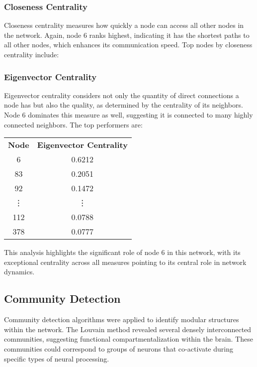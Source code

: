 \documentclass[
	report, %
	11pt, %
]{CSUniSchoolLabReport}
\begin{document}


\subsubsection{Closeness Centrality}

Closeness centrality measures how quickly a node can access all other nodes in the network. Again, node 6 ranks highest, indicating it has the shortest paths to all other nodes, which enhances its communication speed. Top nodes by closeness centrality include:


\subsubsection{Eigenvector Centrality}

Eigenvector centrality considers not only the quantity of direct connections a node has but also the quality, as determined by the centrality of its neighbors. Node 6 dominates this measure as well, suggesting it is connected to many highly connected neighbors. The top performers are:

\begin{tabular}{c c}
\textbf{Node} & \textbf{Eigenvector Centrality} \\
6 & 0.6212 \\
83 & 0.2051 \\
92 & 0.1472 \\
\vdots & \vdots \\
112 & 0.0788 \\
378 & 0.0777 \\
\end{tabular}

This analysis highlights the significant role of node 6 in this network, with its exceptional centrality across all measures pointing to its central role in network dynamics.



\subsection{Community Detection}

Community detection algorithms were applied to identify modular structures within the network. The Louvain method revealed several densely interconnected communities, suggesting functional compartmentalization within the brain. These communities could correspond to groups of neurons that co-activate during specific types of neural processing.
\end{document}
